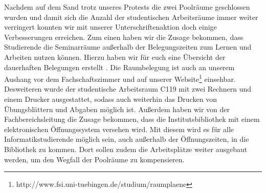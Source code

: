 Nachdem auf dem Sand trotz unseres Protests die zwei Poolräume  geschlossen wurden und damit sich die Anzahl der studentischen Arbeitsräume immer weiter verringert konnten wir mit unserer Unterschriftenaktion doch einige Verbesserungen erreichen. Zum einen haben wir die Zusage bekommen, dass Studierende die Seminarräume außerhalb der Belegungszeiten zum Lernen und Arbeiten nutzen können. Hierzu haben wir für euch eine Übersicht der dauerhaften Belegungen erstellt . Die Raumbelegung ist auch an unserem Aushang vor dem Fachschaftszimmer und auf unserer Website\footnote{http://www.fsi.uni-tuebingen.de/studium/raumplaene} einsehbar.\\
Desweiteren wurde der studentische Arbeitsraum C119 mit zwei Rechnern und einem Drucker ausgestattet, sodass auch weiterhin das Drucken von Übungsblättern und Abgaben möglich ist.
Außerdem haben wir von der Fachbereichsleitung die Zusage bekommen, dass die Institutsbibliothek mit einem elektronischen Öffnungssystem versehen wird. Mit diesem wird es für alle Informatikstudierende möglich sein, auch außerhalb der Öffnungszeiten, in die Bibliothek zu kommen. Dort sollen zudem die Arbeitsplätze weiter ausgebaut werden, um den Wegfall der Poolräume zu kompensieren.
